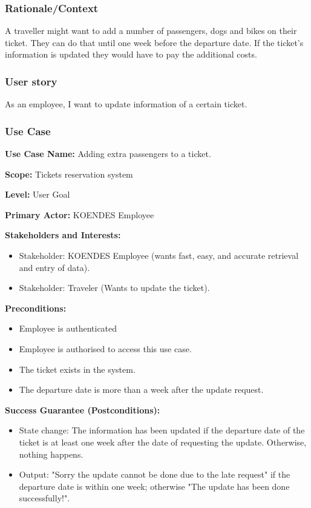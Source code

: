 \subsubsection{Rationale/Context}
A traveller might want to add a number of passengers, dogs and bikes on their ticket. They can do that until one week before the departure date. If the ticket's information is updated they would have to pay the additional costs.
\subsubsection{User story}
As an employee, I want to update information of a certain ticket.
\subsubsection{Use Case}
\creator{\studentB}


\textbf{Use Case Name:} Adding extra passengers to a ticket.

\textbf{Scope:} Tickets reservation system

\textbf{Level:} User Goal

\textbf{Primary Actor:}  KOENDES Employee

\textbf{Stakeholders and Interests:} 
\begin{itemize}
\item Stakeholder: KOENDES Employee (wants fast, easy, and accurate retrieval and entry of data).
\item Stakeholder: Traveler (Wants to update the ticket). 
\end{itemize}
\textbf{Preconditions:} 
\begin{itemize}
\item Employee is authenticated
\item Employee is authorised to access this use case.
\item The ticket exists in the system.
\item The departure date is more than a week after the update request.
\end{itemize}

\textbf{Success Guarantee (Postconditions):} 
\begin{itemize}
\item State change: The information has been updated if the departure date of the ticket is at least one week after the date of requesting the update. Otherwise, nothing happens. 
\item Output: "Sorry the update cannot be done due to the late request" if the departure date is within one week; otherwise "The update has been done successfully!".
\end{itemize}

